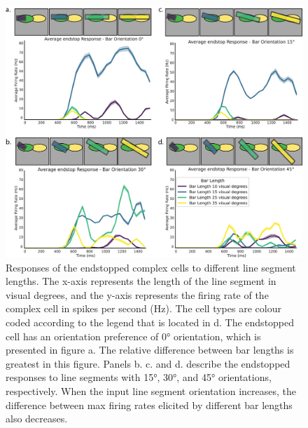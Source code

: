 \documentclass[12pt]{article}
\begin{document}
\begin{figure}[H]
    \centering
    \includegraphics[width=1.0 \textwidth]{./figures/LIF_endstopping_length_orientation.png}
    \caption{Responses of the endstopped complex cells to different line segment lengths. The x-axis represents the length of the line segment in visual degrees, and the y-axis represents the firing rate of the complex cell in spikes per second (Hz). The cell types are colour coded according to the legend that is located in d. The endstopped cell has an orientation preference of 0° orientation, which is presented in figure a. The relative difference between bar lengths is greatest in this figure. Panels b. c. and d. describe the endstopped responses to line segments with 15°, 30°, and 45° orientations, respectively. When the input line segment orientation increases, the difference between max firing rates elicited by different bar lengths also decreases.}
    \label{fig:endstopping}
\end{figure}
\end{document}

